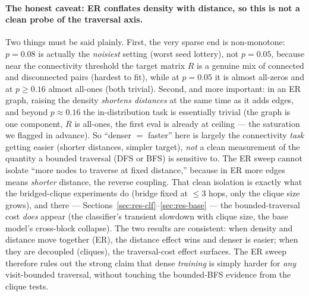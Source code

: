 \documentclass[11pt,a4paper]{article}
\begin{document}
\paragraph{The honest caveat: ER conflates density with distance, so this is not a clean probe
of the traversal axis.} Two things must be said plainly. First, the very sparse end is
non-monotone: $p=0.08$ is actually the \emph{noisiest} setting (worst seed lottery), not
$p=0.05$, because near the connectivity threshold the target matrix $R$ is a genuine mix of
connected and disconnected pairs (hardest to fit), while at $p=0.05$ it is almost all-zeros and
at $p\ge0.16$ almost all-ones (both trivial). Second, and more important: in an ER graph,
raising the density \emph{shortens distances} at the same time as it adds edges, and beyond
$p\approx0.16$ the in-distribution task is essentially trivial (the graph is one component, $R$
is all-ones, the first eval is already at ceiling --- the saturation we flagged in advance). So
``denser $=$ faster'' here is largely the connectivity \emph{task} getting easier (shorter
distances, simpler target), \emph{not} a clean measurement of the quantity a bounded traversal
(DFS or BFS) is sensitive to.
The ER sweep cannot isolate ``more nodes to traverse at fixed distance,'' because in ER more
edges means \emph{shorter} distance, the reverse coupling. That clean isolation is exactly what
the bridged-clique experiments do (bridge fixed at $\le3$ hops, only the clique size grows), and
there --- Sections~\ref{sec:res-clf}--\ref{sec:res-base} --- the bounded-traversal cost
\emph{does} appear (the classifier's transient slowdown with clique size, the base model's
cross-block collapse). The two results are consistent: when density and distance move together
(ER), the distance effect wins and denser is easier; when they are decoupled (cliques), the
traversal-cost effect surfaces. The ER sweep therefore rules out the strong claim that dense
\emph{training} is simply harder for \emph{any} visit-bounded traversal, without touching the
bounded-BFS evidence from the clique tests.
\end{document}
